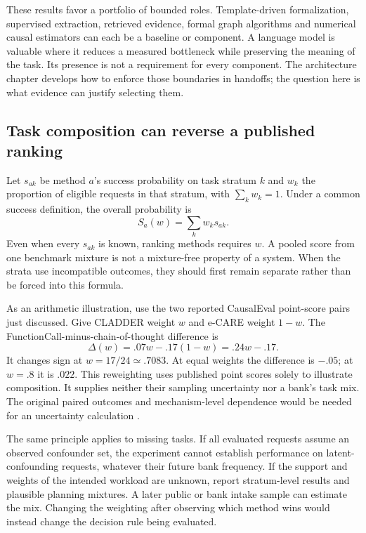 These results favor a portfolio of bounded roles. Template-driven formalization,
supervised extraction, retrieved evidence, formal graph algorithms and numerical
causal estimators can each be a baseline or component. A language model is
valuable where it reduces a measured bottleneck while preserving the meaning
of the task. Its presence is not a requirement for every component. The
architecture chapter develops how to enforce those boundaries in handoffs;
the question here is what evidence can justify selecting them.

\subsection{Task composition can reverse a published ranking}

Let $s_{ak}$ be method $a$'s success probability on task stratum $k$ and $w_k$
the proportion of eligible requests in that stratum, with $\sum_k w_k=1$.
Under a common success definition, the overall probability is
\begin{equation}
 S_a(w)=\sum_k w_k s_{ak}.
 \label{exec13:frontier-mixture}
\end{equation}
Even when every $s_{ak}$ is known, ranking methods requires $w$. A pooled score
from one benchmark mixture is not a mixture-free property of a system. When
the strata use incompatible outcomes, they should first remain separate rather
than be forced into this formula.

As an arithmetic illustration, use the two reported CausalEval point-score
pairs just discussed. Give CLADDER weight $w$ and e-CARE weight $1-w$. The
FunctionCall-minus-chain-of-thought difference is
\begin{equation}
 \Delta(w)=.07w-.17(1-w)=.24w-.17.
 \label{exec13:frontier-rank}
\end{equation}
It changes sign at $w=17/24\simeq.7083$. At equal weights the difference is
$-.05$; at $w=.8$ it is $.022$. This reweighting uses published point scores
solely to illustrate composition. It supplies neither their sampling
uncertainty nor a bank's task mix. The original paired outcomes and
mechanism-level dependence would be needed for an uncertainty calculation
\citep{exec13_census_causaleval,exec13_frontier_exact}.

The same principle applies to missing tasks. If all evaluated requests assume
an observed confounder set, the experiment cannot establish performance on
latent-confounding requests, whatever their future bank frequency. If the
support and weights of the intended workload are unknown, report stratum-level
results and plausible planning mixtures. A later public or bank intake sample
can estimate the mix. Changing the weighting after observing which method wins
would instead change the decision rule being evaluated.

